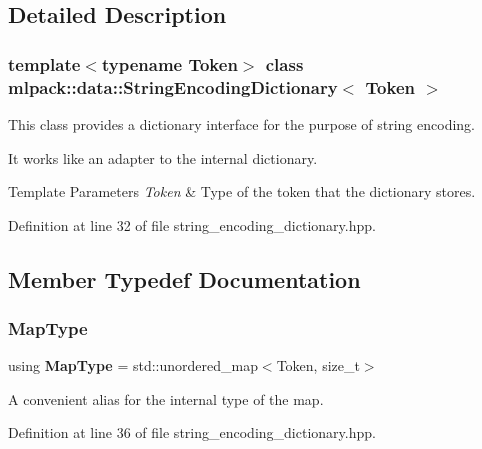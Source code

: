 \subsection{Detailed Description}
\subsubsection*{template$<$typename Token$>$\newline
class mlpack\+::data\+::\+String\+Encoding\+Dictionary$<$ Token $>$}

This class provides a dictionary interface for the purpose of string encoding. 

It works like an adapter to the internal dictionary.


\begin{DoxyTemplParams}{Template Parameters}
{\em Token} & Type of the token that the dictionary stores. \\
\hline
\end{DoxyTemplParams}


Definition at line 32 of file string\+\_\+encoding\+\_\+dictionary.\+hpp.



\subsection{Member Typedef Documentation}
\mbox{\label{classmlpack_1_1data_1_1StringEncodingDictionary_a246bffdf7ac108884d4d3bbd6fdac4a2}} 
\subsubsection{Map\+Type}
{\footnotesize\ttfamily using \textbf{ Map\+Type} =  std\+::unordered\+\_\+map$<$Token, size\+\_\+t$>$}



A convenient alias for the internal type of the map. 



Definition at line 36 of file string\+\_\+encoding\+\_\+dictionary.\+hpp.

\mbox{\label{classmlpack_1_1data_1_1StringEncodingDictionary_a408e837518782ddd4a94948d84a619f7}} 
